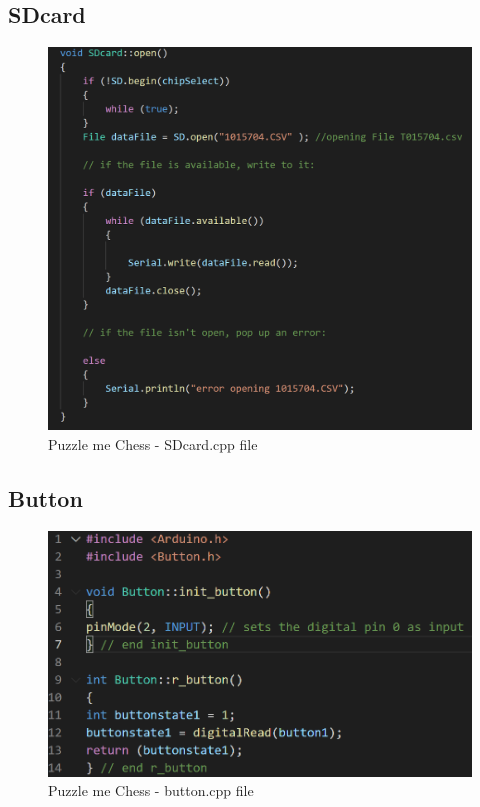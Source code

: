 \documentclass[11pt]{article}
\begin{document}
\subsection{SDcard}

\begin{figure}
  \includegraphics[width=\linewidth]{./Pics/sdcardpart3.PNG}
  \caption{Puzzle me Chess - SDcard.cpp file}
  \label{fig:sdcard1}
\end{figure}

\subsection{Button}

\begin{figure}
  \includegraphics[width=\linewidth]{./Pics/buttoncpp.PNG}
  \caption{Puzzle me Chess - button.cpp file}
  \label{fig:button}
\end{figure}
\end{document}
